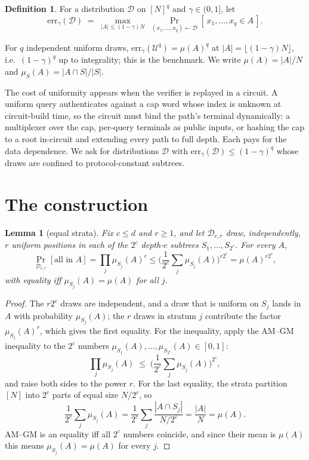 \documentclass[11pt]{article}
\newcommand{\N}{N}
\newcommand{\err}{\mathrm{err}}
\newcommand{\Unif}{\mathcal{U}}
\newtheorem{lemma}[theorem]{Lemma}
\theoremstyle{definition}
\newtheorem{definition}[theorem]{Definition}
\begin{document}
\begin{definition}
For a distribution $\mathcal{D}$ on $[\N]^q$ and $\gamma \in (0,1]$, let
\[
\err_\gamma(\mathcal{D}) \;=\;
\max_{|A| \le (1-\gamma)\N}\;
\Pr_{(x_1,\dots,x_q) \leftarrow \mathcal{D}}[\, x_1, \dots, x_q \in A \,].
\]
\end{definition}

For $q$ independent uniform draws, $\err_\gamma(\Unif^q) = \mu(A)^q$ at
$|A| = \lfloor (1-\gamma)\N \rfloor$, i.e.\ $(1-\gamma)^q$ up to
integrality; this is the benchmark. We write $\mu(A) = |A|/\N$ and
$\mu_S(A) = |A \cap S| / |S|$.

The cost of uniformity appears when the verifier is replayed in a
circuit. A uniform query authenticates against a cap word whose index is
unknown at circuit-build time, so the circuit must bind the path's
terminal dynamically: a multiplexer over the cap, per-query terminals as
public inputs, or hashing the cap to a root in-circuit and extending
every path to full depth. Each pays for the data dependence. We ask for
distributions $\mathcal{D}$ with $\err_\gamma(\mathcal{D}) \le
(1-\gamma)^q$ whose draws are confined to protocol-constant subtrees.

\section{The construction}

\begin{lemma}[equal strata]\label{lem:amgm}
Fix $c \le d$ and $r \ge 1$, and let $\mathcal{D}_{c,r}$ draw,
independently, $r$ uniform positions in each of the $2^c$ depth-$c$
subtrees $S_1, \dots, S_{2^c}$. For every $A$,
\[
\Pr_{\mathcal{D}_{c,r}}[\text{all in } A]
= \prod_{j} \mu_{S_j}(A)^{r}
\le \Big( \frac{1}{2^c} \sum_{j} \mu_{S_j}(A) \Big)^{r 2^c}
= \mu(A)^{r 2^c},
\]
with equality iff $\mu_{S_j}(A) = \mu(A)$ for all $j$.
\end{lemma}

\begin{proof}
The $r 2^c$ draws are independent, and a draw that is uniform on $S_j$
lands in $A$ with probability $\mu_{S_j}(A)$; the $r$ draws in stratum
$j$ contribute the factor $\mu_{S_j}(A)^r$, which gives the first
equality. For the inequality, apply the AM--GM inequality to the $2^c$
numbers $\mu_{S_1}(A), \dots, \mu_{S_{2^c}}(A) \in [0,1]$:
\[
\prod_{j} \mu_{S_j}(A) \;\le\; \Big( \frac{1}{2^c} \sum_j \mu_{S_j}(A) \Big)^{2^c},
\]
and raise both sides to the power $r$. For the last equality, the strata
partition $[\N]$ into $2^c$ parts of equal size $\N / 2^c$, so
\[
\frac{1}{2^c} \sum_j \mu_{S_j}(A)
= \frac{1}{2^c} \sum_j \frac{|A \cap S_j|}{\N/2^c}
= \frac{|A|}{\N} = \mu(A).
\]
AM--GM is an equality iff all $2^c$ numbers coincide, and since their
mean is $\mu(A)$ this means $\mu_{S_j}(A) = \mu(A)$ for every $j$.
\end{proof}
\end{document}
